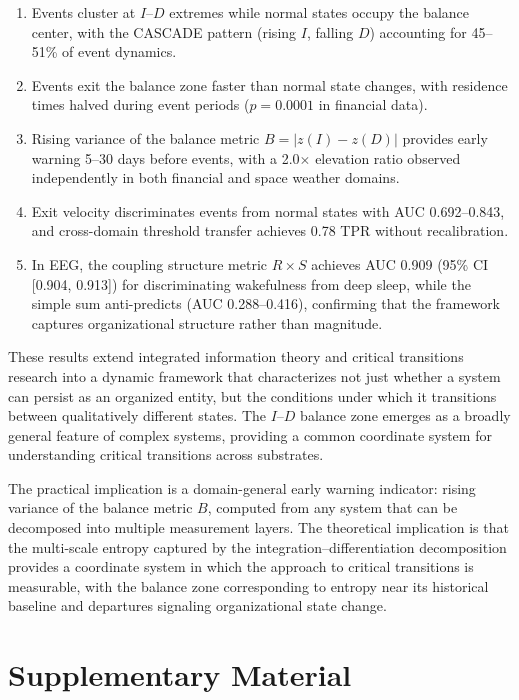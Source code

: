 \documentclass[aip,cha,reprint,amsmath,amssymb,final]{revtex4-2}
\begin{document}
\begin{enumerate}
\item Events cluster at $I$--$D$ extremes while normal states occupy the balance center, with the CASCADE pattern (rising $I$, falling $D$) accounting for 45--51\% of event dynamics.
\item Events exit the balance zone faster than normal state changes, with residence times halved during event periods ($p = 0.0001$ in financial data).
\item Rising variance of the balance metric $B = |z(I) - z(D)|$ provides early warning 5--30 days before events, with a 2.0$\times$ elevation ratio observed independently in both financial and space weather domains.
\item Exit velocity discriminates events from normal states with AUC 0.692--0.843, and cross-domain threshold transfer achieves 0.78 TPR without recalibration.
\item In EEG, the coupling structure metric $R \times S$ achieves AUC 0.909 (95\% CI [0.904, 0.913]) for discriminating wakefulness from deep sleep, while the simple sum anti-predicts (AUC 0.288--0.416), confirming that the framework captures organizational structure rather than magnitude.
\end{enumerate}

These results extend integrated information theory and critical transitions research into a dynamic framework that characterizes not just whether a system can persist as an organized entity, but the conditions under which it transitions between qualitatively different states. The $I$--$D$ balance zone emerges as a broadly general feature of complex systems, providing a common coordinate system for understanding critical transitions across substrates.

The practical implication is a domain-general early warning indicator: rising variance of the balance metric $B$, computed from any system that can be decomposed into multiple measurement layers. The theoretical implication is that the multi-scale entropy captured by the integration--differentiation decomposition provides a coordinate system in which the approach to critical transitions is measurable, with the balance zone corresponding to entropy near its historical baseline and departures signaling organizational state change.


\section*{Supplementary Material}
\end{document}
